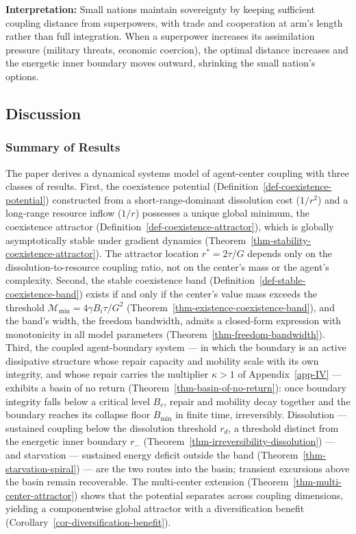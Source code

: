 \documentclass[11pt]{article}
\theoremstyle{plain}
\theoremstyle{definition}
\theoremstyle{remark}
\let\origsubsection\subsection
\renewcommand{\subsection}{\needspace{7\baselineskip}\origsubsection}
\let\origsubsubsection\subsubsection
\renewcommand{\subsubsection}{\needspace{4\baselineskip}\origsubsubsection}
\begin{document}
\textbf{Interpretation:} Small nations maintain sovereignty by keeping
sufficient coupling distance from superpowers, with trade and
cooperation at arm's length rather than full integration. When a
superpower increases its assimilation pressure (military threats,
economic coercion), the optimal distance increases and the energetic
inner boundary moves outward, shrinking the small nation's options.

\subsection{Discussion}\label{discussion-5}

\subsubsection{Summary of Results}\label{summary-of-results-2}

The paper derives a dynamical systems model of agent-center coupling
with three classes of results. First, the coexistence potential
(Definition~\ref{def-coexistence-potential}) constructed from a
short-range-dominant dissolution cost (\(1/r^2\)) and a long-range
resource inflow (\(1/r\)) possesses a unique global minimum, the
coexistence attractor (Definition~\ref{def-coexistence-attractor}),
which is globally asymptotically stable under gradient dynamics
(Theorem~\ref{thm-stability-coexistence-attractor}). The attractor
location \(r^* = 2\tau/G\) depends only on the dissolution-to-resource
coupling ratio, not on the center's mass or the agent's complexity.
Second, the stable coexistence band
(Definition~\ref{def-stable-coexistence-band}) exists if and only if the
center's value mass exceeds the threshold
\(\mathcal{M}_{\min} = 4\gamma B_i \tau / G^2\)
(Theorem~\ref{thm-existence-coexistence-band}), and the band's width,
the freedom bandwidth, admits a closed-form expression with monotonicity
in all model parameters (Theorem~\ref{thm-freedom-bandwidth}). Third,
the coupled agent-boundary system --- in which the boundary is an active
dissipative structure whose repair capacity and mobility scale with its
own integrity, and whose repair carries the multiplier \(\kappa > 1\) of
Appendix~\ref{app-IV} --- exhibits a basin of no return
(Theorem~\ref{thm-basin-of-no-return}): once boundary integrity falls
below a critical level \(B_c\), repair and mobility decay together and
the boundary reaches its collapse floor \(B_{\min}\) in finite time,
irreversibly. Dissolution --- sustained coupling below the dissolution
threshold \(r_d\), a threshold distinct from the energetic inner
boundary \(r_-\) (Theorem~\ref{thm-irreversibility-dissolution}) --- and
starvation --- sustained energy deficit outside the band
(Theorem~\ref{thm-starvation-spiral}) --- are the two routes into the
basin; transient excursions above the basin remain recoverable. The
multi-center extension (Theorem~\ref{thm-multi-center-attractor}) shows
that the potential separates across coupling dimensions, yielding a
componentwise global attractor with a diversification benefit
(Corollary~\ref{cor-diversification-benefit}).
\end{document}
